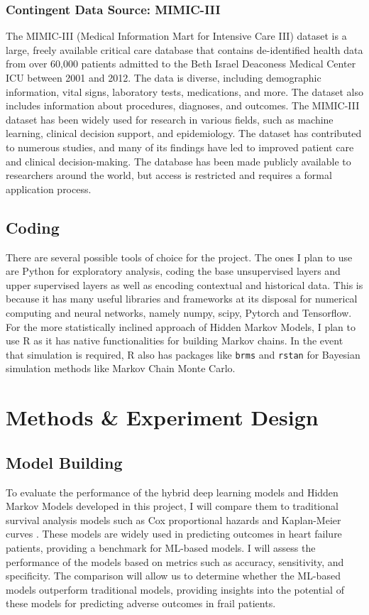 \documentclass[%
 reprint,
 amsmath,amssymb,
 aps,
 nofootinbib,
]{revtex4-2}
\theoremstyle{definition}
\begin{document}
\subsubsection{\label{mimiciii} Contingent Data Source: MIMIC-III}

The MIMIC-III (Medical Information Mart for Intensive Care III) dataset is a large, freely available critical care database that contains de-identified health data from over 60,000 patients admitted to the Beth Israel Deaconess Medical Center ICU between 2001 and 2012. The data is diverse, including demographic information, vital signs, laboratory tests, medications, and more. The dataset also includes information about procedures, diagnoses, and outcomes. The MIMIC-III dataset has been widely used for research in various fields, such as machine learning, clinical decision support, and epidemiology. The dataset has contributed to numerous studies, and many of its findings have led to improved patient care and clinical decision-making. The database has been made publicly available to researchers around the world, but access is restricted and requires a formal application process.

\subsection{\label{coding}Coding}

There are several possible tools of choice for the project. The ones I plan to use are Python for exploratory analysis, coding the base unsupervised layers and upper supervised layers as well as encoding contextual and historical data. This is because it has many useful libraries and frameworks at its disposal for numerical computing and neural networks, namely numpy, scipy, Pytorch and Tensorflow. For the more statistically inclined approach of Hidden Markov Models, I plan to use R as it has native functionalities for building Markov chains. In the event that simulation is required, R also has packages like \texttt{brms} and \texttt{rstan} for Bayesian simulation methods like Markov Chain Monte Carlo.

\section{\label{methods}Methods \& Experiment Design}

\subsection{\label{build}Model Building}
To evaluate the performance of the hybrid deep learning models and Hidden Markov Models developed in this project, I will compare them to traditional survival analysis models such as Cox proportional hazards \cite{kumar1994proportional} and Kaplan-Meier curves \cite{bland1998survival}. These models are widely used in predicting outcomes in heart failure patients, providing a benchmark for ML-based models. I will assess the performance of the models based on metrics such as accuracy, sensitivity, and specificity. The comparison will allow us to determine whether the ML-based models outperform traditional models, providing insights into the potential of these models for predicting adverse outcomes in frail patients.
\end{document}

